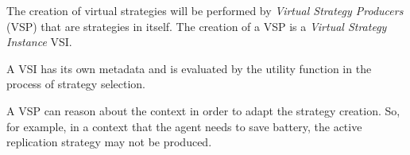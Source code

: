 The creation of virtual strategies will be performed by \emph{Virtual Strategy Producers} (VSP) that are strategies in itself. The creation of a VSP is a \emph{Virtual Strategy Instance} VSI.

A VSI has its own metadata and is evaluated by the utility function in the process of strategy selection.


 A VSP can reason about the context in order to adapt the strategy creation. So, for example, in a context that the agent needs to save battery, the active replication strategy may not be produced.
